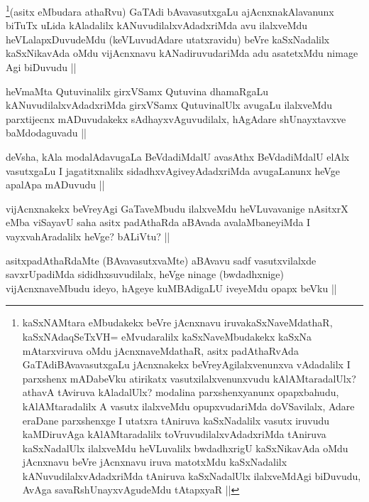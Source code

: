 \begin{artha}
\footnote{kaSxNAMtara eMbudakekx beVre jAcnxnavu iruvakaSxNaveMdathaR, kaSxNAdaqSeTxVH= eMvudaralilx kaSxNaveMbudakekx kaSxNa mAtarxviruva oMdu jAcnxnaveMdathaR, asitx padAthaRvAda GaTAdiBAvavasutxgaLu jAcnxnakekx beVreyAgilalxvenunxva vAdadalilx I parxshenx mADabeVku atirikatx vasutxilalxvenunxvudu kAlAMtaradalUlx? athavA tAviruva kAladalUlx? modalina parxshenxyanunx opapxbahudu, kAlAMtaradalilx A vasutx ilalxveMdu opupxvudariMda doVSavilalx, Adare eraDane parxshenxge I utatxra tAniruva kaSxNadalilx vasutx iruvudu kaMDiruvAga kAlAMtaradalilx toVruvudilalxvAdadxriMda tAniruva kaSxNadalUlx ilalxveMdu heVLuvalilx bwdadhxrigU kaSxNikavAda oMdu jAcnxnavu beVre jAcnxnavu iruva matotxMdu kaSxNadalilx kANuvudilalxvAdadxriMda tAniruva kaSxNadalUlx ilalxveMdAgi biDuvudu, AvAga savaRshUnayxvAgudeMdu tAtapxyaR ||}(asitx eMbudara athaRvu) GaTAdi bAvavasutxgaLu ajAcnxnakAlavanunx biTuTx uLida kAladalilx kANuvudilalxvAdadxriMda avu ilalxveMdu heVLalapxDuvudeMdu (keVLuvudAdare utatxravidu) beVre kaSxNadalilx kaSxNikavAda oMdu vijAcnxnavu kANadiruvudariMda adu asatetxMdu nimage Agi biDuvudu ||
\end{artha}

\begin{artha}
heVmaMta Qutuvinalilx girxVSamx Qutuvina dhamaRgaLu kANuvudilalxvAdadxriMda girxVSamx QutuvinalUlx avugaLu ilalxveMdu parxtijecnx mADuvudakekx sAdhayxvAguvudilalx, hAgAdare shUnayxtavxve baMdodaguvadu ||
\end{artha}

\begin{artha}
deVsha, kAla modalAdavugaLa BeVdadiMdalU avasAthx BeVdadiMdalU elAlx vasutxgaLu I jagatitxnalilx sidadhxvAgiveyAdadxriMda avugaLanunx heVge apalApa mADuvudu ||
\end{artha}

\begin{artha}
vijAcnxnakekx beVreyAgi GaTaveMbudu ilalxveMdu heVLuvavanige nAsitxrX eMba viSayavU saha asitx padAthaRda aBAvada avalaMbaneyiMda I vayxvahAradalilx heVge? bALiVtu? ||
\end{artha}

\begin{artha}
asitxpadAthaRdaMte (BAvavasutxvaMte) aBAvavu sadf vasutxvilalxde savxrUpadiMda sididhxsuvudilalx, heVge ninage (bwdadhxnige) vijAcnxnaveMbudu ideyo, hAgeye kuMBAdigaLU iveyeMdu opapx beVku ||
\end{artha}

